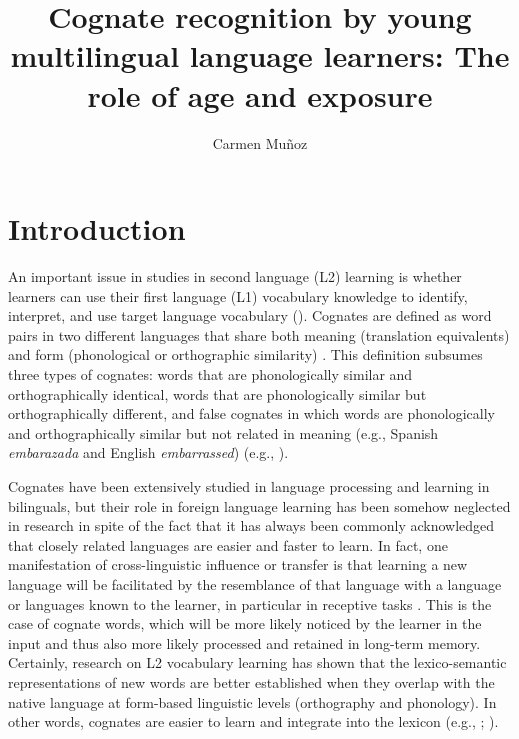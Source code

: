 \documentclass[output=paper,modfonts,nonflat,newtxmath]{langsci/langscibook}
\author{Carmen Muñoz\affiliation{Universitat de Barcelona}}
\title{Cognate recognition by young multilingual language learners: The role of age and exposure}
\begin{document}
\maketitle

\section{Introduction}

An important issue in studies in second language (L2) learning is whether learners can use their first language (L1) vocabulary knowledge to identify, interpret, and use target language vocabulary (\citealt{MendezPerezEtAl2010}). Cognates are defined as word pairs in two different languages that share both meaning (translation equivalents) and form (phonological or orthographic similarity) \citep{KohnertEtAl2004}. This definition subsumes three types of cognates: words that are phonologically similar and orthographically identical, words that are phonologically similar but orthographically different, and false cognates in which words are phonologically and orthographically similar but not related in meaning (e.g., Spanish \textit{embarazada} and English \textit{embarrassed}) (e.g., \citealt{Rodriguez2001}).

Cognates have been extensively studied in language processing and learning in bilinguals, but their role in foreign language learning has been somehow neglected in research in spite of the fact that it has always been commonly acknowledged that closely related languages are easier and faster to learn. In fact, one manifestation of cross-linguistic influence or transfer is that learning a new language will be facilitated by the resemblance of that language with a language or languages known to the learner, in particular in receptive tasks \citep{Ringbom2007}. This is the case of cognate words, which will be more likely noticed by the learner in the input and thus also more likely processed and retained in long-term memory. Certainly, research on L2 vocabulary learning has shown that the lexico-semantic representations of new words are better established when they overlap with the native language at form-based linguistic levels (orthography and phonology). In other words, cognates are easier to learn and integrate into the lexicon (e.g., \citealt{EllisNBeaton1993}; \citealt{DeGrootvanHell2005}).
\end{document}
